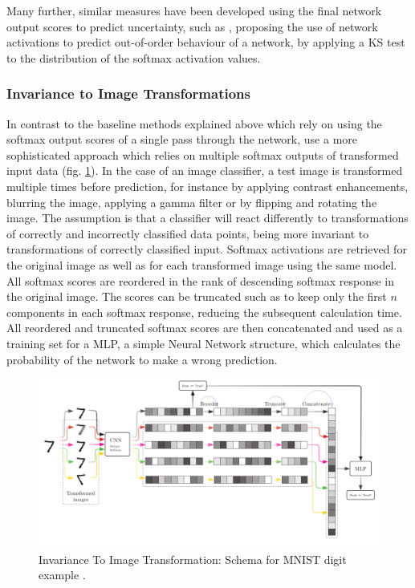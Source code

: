 \documentclass[10pt]{article}
\begin{document}
Many further, similar measures have been developed using the final network output scores to predict uncertainty, such as \textcite{Sun2018KSconfA}, proposing the use of network activations to predict out-of-order behaviour of a network, by applying a \gls{KS} test to the distribution of the softmax activation values.

\subsubsection{Invariance to Image Transformations}
In contrast to the baseline methods explained above which rely on using the softmax output scores of a single pass through the network, \textcite{Bahat_2018} use a more sophisticated approach which relies on multiple softmax outputs of transformed input data (fig. \ref{fig:schema-baseline1}). In the case of an image classifier, a test image is transformed multiple times before prediction, for instance by applying contrast enhancements, blurring the image, applying a gamma filter or by flipping and rotating the image. The assumption is that a classifier will react differently to transformations of correctly and incorrectly classified data points, being more invariant to transformations of correctly classified input. Softmax activations are retrieved for the original image as well as for each transformed image using the same model. All softmax scores are reordered in the rank of descending softmax response in the original image. The scores can be truncated such as to keep only the first $n$ components in each softmax response, reducing the subsequent calculation time. All reordered and truncated softmax scores are then concatenated and used as a training set for a \gls{MLP}, a simple Neural Network structure, which calculates the probability of the network to make a wrong prediction.

\begin{figure}[H]
    \centering
    \includegraphics[width=\textwidth]{Schema/schema_baseline_1}
    \caption{Invariance To Image Transformation: Schema for \gls{MNIST} digit example \cite{Bahat_2018}.}
    \label{fig:schema-baseline1}
\end{figure}
\end{document}
